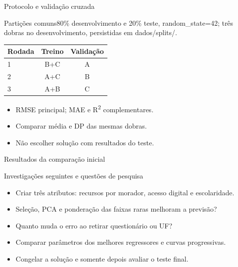 \begin{frame}{Protocolo e validação cruzada}
\begin{block}{Partições comuns}80\% desenvolvimento e 20\% teste, random\_state=42; três dobras no desenvolvimento, persistidas em dados/splits/.\end{block}
\centering\begin{tabular}{lcc}\toprule Rodada & Treino & Validação\\\midrule 1 & B+C & A\\2 & A+C & B\\3 & A+B & C\\\bottomrule\end{tabular}
\vspace{3mm}\begin{itemize}\item RMSE principal; MAE e R\textsuperscript{2} complementares.
\item Comparar média e DP das mesmas dobras.
\item Não escolher solução com resultados do teste.\end{itemize}
\end{frame}
\begin{frame}{Resultados da comparação inicial}
\end{frame}
\begin{frame}{Investigações seguintes e questões de pesquisa}
\begin{itemize}\item Criar três atributos: recursos por morador, acesso digital e escolaridade.
\item Seleção, PCA e ponderação das faixas raras melhoram a previsão?
\item Quanto muda o erro ao retirar questionário ou UF?
\item Comparar parâmetros dos melhores regressores e curvas progressivas.
\item Congelar a solução e somente depois avaliar o teste final.
\end{itemize}
\end{frame}

